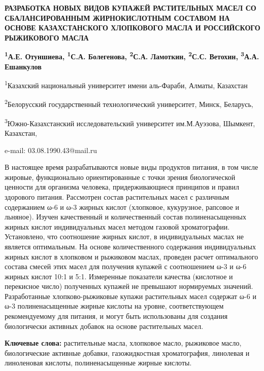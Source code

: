 \begin{center}
{\large\bfseries РАЗРАБОТКА НОВЫХ ВИДОВ КУПАЖЕЙ РАСТИТЕЛЬНЫХ МАСЕЛ СО СБАЛАНСИРОВАННЫМ ЖИРНОКИСЛОТНЫМ СОСТАВОМ НА ОСНОВЕ КАЗАХСТАНСКОГО ХЛОПКОВОГО МАСЛА И РОССИЙСКОГО РЫЖИКОВОГО МАСЛА}

{\bfseries \textsuperscript{1}А.Е. Отуншиева\envelope, \textsuperscript{1}С.А. Болегенова, \textsuperscript{2}С.А. Ламоткин, \textsuperscript{2}С.С. Ветохин, \textsuperscript{3}А.А. Ешанкулов}

\textsuperscript{1}Казахский национальный университет имени аль-Фараби,
Алматы, Казахстан

\textsuperscript{2}Белорусский государственный технологический
университет, Минск, Беларусь,

\textsuperscript{3}Южно-Казахстанский исследовательский университет
им.М.Ауэзова, Шымкент, Казахстан,

e-mail: 03.08.1990.43@mail.ru
\end{center}

В настоящее время разрабатываются новые виды продуктов питания, в том
числе жировые, функционально ориентированные с точки зрения
биологической ценности для организма человека, придерживающиеся
принципов и правил здорового питания. Рассмотрен состав растительных
масел с различным содержанием ω-6 и ω-3 жирных кислот (хлопковое,
кукурузное, рапсовое и льняное). Изучен качественный и количественный
состав полиненасыщенных жирных кислот индивидуальных масел методом
газовой хроматографии. Установлено, что соотношение жирных кислот, в
индивидуальных маслах не является оптимальным. На основе количественного
содержания индивидуальных жирных кислот в хлопковом и рыжиковом маслах,
проведен расчет оптимального состава смесей этих масел для получения
купажей с соотношением ω-3 и ω-6 жирных кислот 10:1 и 5:1. Измеренные
показатели качества (кислотное и перекисное число) полученных купажей не
превышают нормируемых значений. Разработанные хлопково-рыжиковые купажи
растительных масел содержат ω-6 и ω-3 полиненасыщенные жирные кислоты на
уровне, соответствующем рекомендуемому для питания, и могут быть
использованы для создания биологически активных добавок на основе
растительных масел.

{\bfseries Ключевые слова:} растительные масла, хлопковое масло, рыжиковое
масло, биологические активные добавки, газожидкостная хроматография,
линолевая и линоленовая кислоты, полиненасыщенные жирные кислоты.

